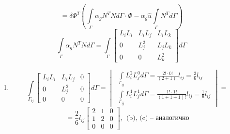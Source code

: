 \begin{enumerate}
	\[=\delta\Phi^T \left(\int \limits_{\Gamma} \alpha_g N^T N d\Gamma \cdot \Phi - \alpha_g \hat u \int \limits_{\Gamma} N^T d\Gamma \right)\]
	\[\int \limits_{\Gamma} \alpha_g N^T N d\Gamma = \int \limits_{\Gamma} \begin{bmatrix}
	L_iL_i & L_iL_j & L_iL_k\\
	0 & L_j^2 & L_jL_k\\
	0 & 0 & L_k^2
	\end{bmatrix}
	d\Gamma
	\]
	\begin{enumerate}
	\item \[\displaystyle\int \limits_{\Gamma_{ij}} \begin{bmatrix}
	L_iL_i & L_iL_j & 0\\
	0 & L_j^2 & 0\\
	0 & 0 & 0
	\end{bmatrix}
	d\Gamma = 
	\begin{vmatrix} \displaystyle
			\ \int\limits_{\Gamma_{ij}} L_i^2L_j^0 d\Gamma = \frac{2!\cdot 0!}{(2+1)!} l_{ij} = \frac{2}{6}l_{ij}\\
			\ \displaystyle \int\limits_{\Gamma_{ij}} L_i^1L_j^1 d\Gamma = \frac{1! \cdot 1!}{(1+1+1)!} l_{ij} = \frac{1}{6}l_{ij}
			\end{vmatrix}=\]
	\[= \frac{2}{6}l_{ij} 
	\begin{bmatrix}
	2 & 1 & 0\\
	1 & 2 & 0\\
	0 & 0 & 0
	\end{bmatrix},\ \ \text{(b), (c) -- аналогично}
	\]
	\end{enumerate}
	\end{enumerate}